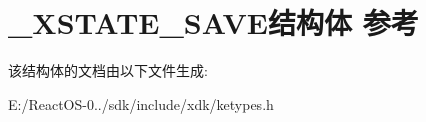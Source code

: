 \hypertarget{struct___x_s_t_a_t_e___s_a_v_e}{}\section{\+\_\+\+X\+S\+T\+A\+T\+E\+\_\+\+S\+A\+V\+E结构体 参考}
\label{struct___x_s_t_a_t_e___s_a_v_e}


该结构体的文档由以下文件生成\+:\begin{DoxyCompactItemize}
\item 
E\+:/\+React\+O\+S-\/0../sdk/include/xdk/ketypes.\+h\end{DoxyCompactItemize}
